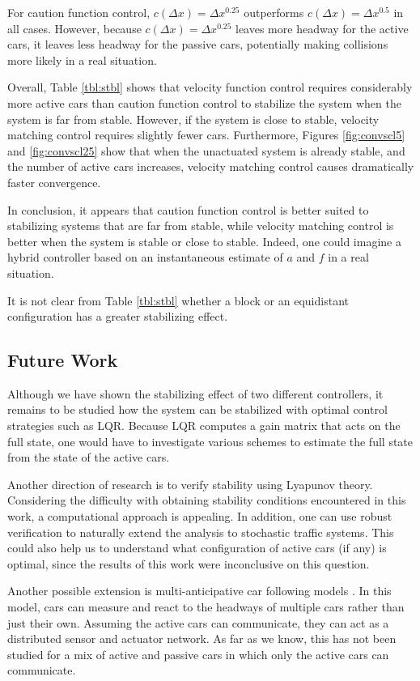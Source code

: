 \documentclass[10pt,twocolumn]{article}
\theoremstyle{ss}
\begin{document}
For caution function control, $c(\Delta x)=\Delta x^{0.25}$ outperforms $c(\Delta x)=\Delta x^{0.5}$ in all cases. However, because $c(\Delta x)=\Delta x^{0.25}$ leaves more headway for the active cars, it leaves less headway for the passive cars, potentially making collisions more likely in a real situation.

Overall, Table \ref{tbl:stbl} shows that velocity function control requires considerably more active cars than caution function control to stabilize the system when the system is far from stable. However, if the system is close to stable, velocity matching control requires slightly fewer cars. Furthermore, Figures \ref{fig:convscl5} and \ref{fig:convscl25} show that when the unactuated system is already stable, and the number of active cars increases, velocity matching control causes dramatically faster convergence. 

In conclusion, it appears that caution function control is better suited to stabilizing systems that are far from stable, while velocity matching control is better when the system is stable or close to stable. Indeed, one could imagine a hybrid controller based on an instantaneous estimate of $a$ and $f$ in a real situation.

It is not clear from Table \ref{tbl:stbl} whether a block or an equidistant configuration has a greater stabilizing effect.

\subsection{Future Work}
Although we have shown the stabilizing effect of two different controllers, it remains to be studied how the system can be stabilized with optimal control strategies such as LQR. Because LQR computes a gain matrix that acts on the full state, one would have to investigate various schemes to estimate the full state from the state of the active cars.

Another direction of research is to verify stability using Lyapunov theory. Considering the difficulty with obtaining stability conditions encountered in this work, a computational approach is appealing. In addition, one can use robust verification to naturally extend the analysis to stochastic traffic systems. This could also help us to understand what configuration of active cars (if any) is optimal, since the results of this work were inconclusive on this question.
 
Another possible extension is multi-anticipative car following models \cite{Lenz}. In this model, cars can measure and react to the headways of multiple cars rather than just their own. Assuming the active cars can communicate, they can act as a distributed sensor and actuator network. As far as we know, this has not been studied for a mix of active and passive cars in which only the active cars can communicate.
\end{document}
